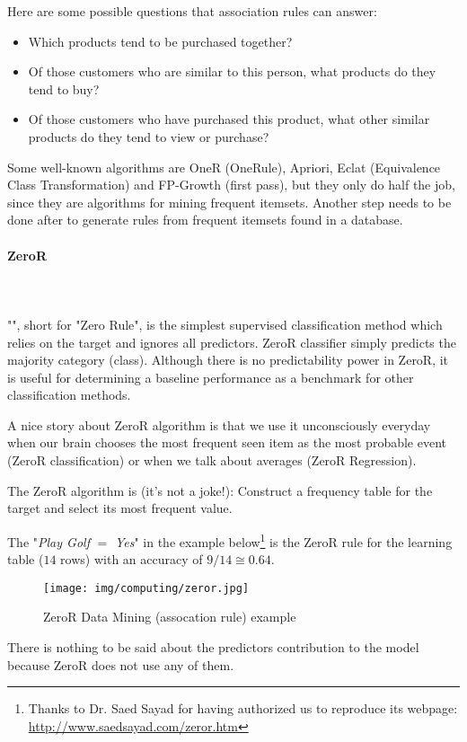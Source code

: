 	Here are some possible questions that association rules can answer:
	\begin{itemize}
		\item Which products tend to be purchased together?
		\item Of those customers who are similar to this person, what products do they tend to buy?
		\item Of those customers who have purchased this product, what other similar products do they tend to
		view or purchase?
	\end{itemize}
	Some well-known algorithms are OneR (OneRule), Apriori, Eclat (Equivalence Class Transformation) and FP-Growth (first pass), but they only do half the job, since they are algorithms for mining frequent itemsets. Another step needs to be done after to generate rules from frequent itemsets found in a database.
	
	\paragraph{ZeroR}\mbox{}\\\\
	"", short for "Zero Rule", is the simplest supervised classification method which relies on the target and ignores all predictors. ZeroR classifier simply predicts the majority category (class). Although there is no predictability power in ZeroR, it is useful for determining a baseline performance as a benchmark for other classification methods.
	
	A nice story about ZeroR algorithm is that we use it unconsciously everyday when our brain chooses the most frequent seen item as the most probable event (ZeroR classification) or when we talk about averages (ZeroR Regression).
	
	The ZeroR algorithm is (it's not a joke!): Construct a frequency table for the target and select its most frequent value.
	
	The "\textit{Play Golf} $=$ \textit{Yes}" in the example below\footnote{Thanks to Dr. Saed Sayad for having authorized us to reproduce its webpage: \url{http://www.saedsayad.com/zeror.htm}} is the ZeroR rule for the learning table ($14$ rows) with an accuracy of $9/14\cong 0.64$.
	\begin{figure}[H]
		\centering
		\texttt{[image: img/computing/zeror.jpg]}
		\caption{ZeroR Data Mining (assocation rule) example}
	\end{figure}
	There is nothing to be said about the predictors contribution to the model because ZeroR does not use any of them.
	
